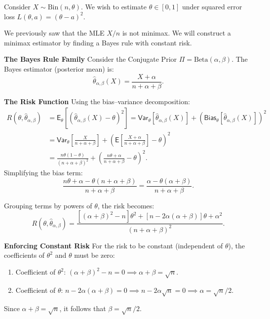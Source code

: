 \begin{ex}
    \label{ex:bmme}
    
    Consider \(X \sim \text{Bin}(n, \theta)\). We wish to estimate \(\theta \in [0, 1]\) under squared error loss \(L(\theta, a) = (\theta - a)^2\).
    
    We previously saw that the MLE \(X/n\) is not minimax. We will construct a minimax estimator by finding a Bayes rule with constant risk.
    
    \textbf{The Bayes Rule Family}
    Consider the Conjugate Prior \(\Pi = \text{Beta}(\alpha, \beta)\). The Bayes estimator (posterior mean) is:
    \[ \hat{\theta}_{\alpha,\beta}(X) = \frac{X+\alpha}{n+\alpha+\beta}. \]
    
    \textbf{The Risk Function}
    Using the bias--variance decomposition:
    \[
    \begin{split}
        R(\theta, \hat{\theta}_{\alpha,\beta}) &= \mathsf{E}_{\theta}\left[\left( \hat{\theta}_{\alpha,\beta}(X)-\theta \right) ^2\right] = \mathsf{Var}_{\theta} [\hat{\theta}_{\alpha,\beta}(X)] + (\mathsf{Bias}_{\theta}[\hat{\theta}_{\alpha,\beta}(X)])^2 \\
        &= \mathsf{Var}_{\theta} \left[ \frac{X}{n+\alpha+\beta} \right] + \left( \mathsf{E} \left[ \frac{X+\alpha}{n+\alpha+\beta} \right] - \theta \right)^2 \\
        &= \frac{n\theta(1-\theta)}{(n+\alpha+\beta)^2} + \left( \frac{n\theta+\alpha}{n+\alpha+\beta} - \theta \right)^2.
    \end{split}
    \]
    Simplifying the bias term:
    \[
        \frac{n\theta+\alpha - \theta(n+\alpha+\beta)}{n+\alpha+\beta} = \frac{\alpha - \theta(\alpha+\beta)}{n+\alpha+\beta}.
    \]
    
    Grouping terms by powers of \(\theta\), the risk becomes:
    \[
    R(\theta, \hat{\theta}_{\alpha,\beta}) = \frac{[(\alpha+\beta)^2 - n]\theta^2 + [n - 2\alpha(\alpha+\beta)]\theta + \alpha^2}{(n+\alpha+\beta)^2}.
    \]
    
    \textbf{Enforcing Constant Risk}
    For the risk to be constant (independent of \(\theta\)), the coefficients of \(\theta^2\) and \(\theta\) must be zero:
    \begin{enumerate}
        \item Coefficient of \(\theta^2\): \((\alpha+\beta)^2 - n = 0 \implies \alpha+\beta = \sqrt{n}\).
        \item Coefficient of \(\theta\): \(n - 2\alpha(\alpha+\beta) = 0 \implies n - 2\alpha\sqrt{n} = 0 \implies \alpha = \sqrt{n}/2\).
    \end{enumerate}
    Since \(\alpha + \beta = \sqrt{n}\), it follows that \(\beta = \sqrt{n}/2\).
    

\end{ex}
